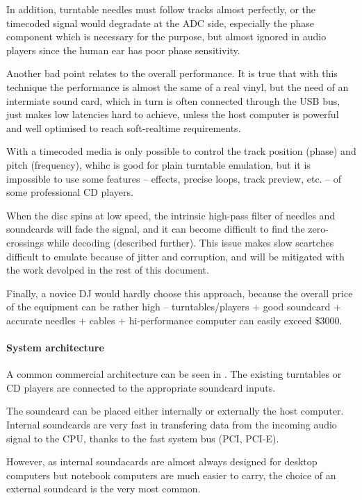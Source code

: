 \documentclass[a4paper,10pt]{article}
\begin{document}
\begin{multicols}{2}
In addition, turntable needles must follow tracks almost perfectly, or the
timecoded signal would degradate at the ADC side, especially the phase
component which is necessary for the purpose, but almost ignored in audio
players since the human ear has poor phase sensitivity.

Another bad point relates to the overall performance. It is true that with
this technique the performance is almost the same of a real vinyl, but the
need of an intermiate sound card, which in turn is often connected through the
USB bus, just makes low latencies hard to achieve, unless the host computer is
powerful and well optimised to reach soft-realtime requirements.

With a timecoded media is only possible to control the track position (phase)
and pitch (frequency), whihc is good for plain turntable emulation, but it is
impossible to use some features -- effects, precise loops, track preview, etc.
-- of some professional CD players.

When the disc spins at low speed, the intrinsic high-pass filter of needles
and soundcards will fade the signal, and it can become difficult to find the
zero-crossings while decoding (described further). This issue makes slow
scartches difficult to emulate because of jitter and corruption, and will be
mitigated with the work devolped in the rest of this document.

Finally, a novice DJ would hardly choose this approach, because the overall
price of the equipment can be rather high -- turntables/players + good
soundcard + accurate needles + cables + hi-performance computer can easily
exceed \$3000. 


\paragraph{System architecture}
A common commercial architecture can be seen in \INSFIG. The existing
turntables or CD players are connected to the appropriate soundcard
inputs.

The soundcard can be placed either internally or externally the host computer.
Internal soundcards are very fast in transfering data from the incoming audio
signal to the CPU, thanks to the fast system bus (PCI, PCI-E).

However, as internal soundacards are almost always designed for desktop
computers but notebook computers are much easier to carry, the choice of an
external soundcard is the very most common.


\end{multicols}
\end{document}
